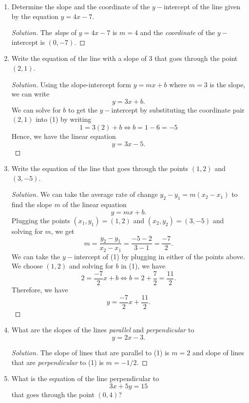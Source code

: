 \documentclass{article}
\begin{document}
\begin{enumerate}
    \begin{proof}[Solution]
    Suppose we start with the slope-intercept form for a line \( y = mx + b \). Pick the point \( (1,5)\) from the graph. Since the \(y-\) intercept is \( b = 2\). We can solve for \( m \) to get the slope of the line. Hence,
    \[ 5 = m + 2 \iff m = 3 \]
    so the equation of the line is 
    \[ y = 3x + 2.\]
    \end{proof}
\item Determine the slope and the coordinate of the \(y-\)intercept of the line given by the equation \( y = 4x - 7 \).
    \begin{proof}[Solution]
    The \textit{slope} of \( y = 4x - 7 \) is \( m = 4 \) and the \textit{coordinate} of the \(y-\)intercept is \( (0,-7)\).
    \end{proof}
\item Write the equation of the line with a slope of \(3\) that goes through the point \( (2,1)\).
    \begin{proof}[Solution]
    Using the slope-intercept form \( y = mx + b \) where \( m = 3 \) is the slope, we can write
    \[ y = 3x + b. \tag{1}\]
    We can solve for \( b \) to get the \(y-\)intercept by substituting the coordinate pair \( (2,1)\) into (1) by writing
    \[ 1 = 3(2) + b \iff b = 1 - 6 = -5 \]
    Hence, we have the linear equation 
    \[ y = 3x - 5.\]
    \end{proof}
\item Write the equation of the line that goes through the points \( (1,2)\) and \((3,-5)\). 
    \begin{proof}[Solution]
    We can take the average rate of change \( y_2 - y_1 = m(x_2 - x_1)\) to find the slope \( m \) of the linear equation 
    \[ y = mx + b. \tag{1}\]
    Plugging the points \((x_1,y_1) = (1,2)\) and \( (x_2, y_2) = (3,-5)\) and solving for \( m \), we get 
    \[ m = \frac{y_2-y_1}{x_2 - x_1} = \frac{-5 - 2 }{ 3 - 1 } = \frac{-7}{2}.\]
    We can take the \(y-\)intercept of (1) by plugging in either of the points above. We choose \((1,2)\) and solving for \(b\) in (1), we have
    \[ 2 = \frac{-7}{2}x + b \iff b = 2 + \frac{7}{2} = \frac{11}{2}.\]
    Therefore, we have 
    \[ y = \frac{-7}{2}x + \frac{11}{2}.\]
    \end{proof}
\item What are the slopes of the lines \textit{parallel} and \textit{perpendicular} to 
    \[ y = 2x - 3. \tag{1}\]
    \begin{proof}[Solution]
    The slope of lines that are parallel to (1) is \( m = 2 \) and slope of lines that are \textit{perpendicular} to (1) is \( m = -1/2\).
    \end{proof}
\item What is the equation of the line perpendicular to \[ 3x + 5y = 15 \tag{1}\] that goes through the point \((0,4)\)?
        

\end{enumerate}
\end{document}
